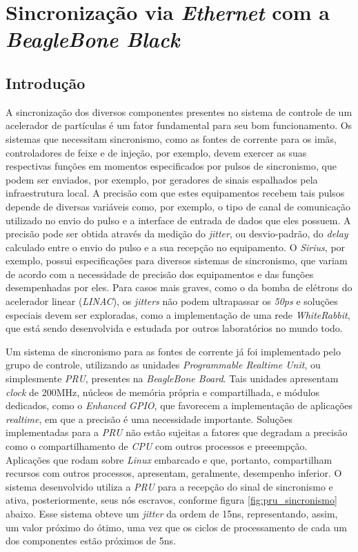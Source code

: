 \section {Sincronização via \textit{Ethernet} com a \textit{BeagleBone Black}}

\subsection {Introdução}

A sincronização dos diversos componentes presentes no sistema de controle de um
acelerador de partículas é um fator fundamental para seu bom funcionamento. Os
sistemas que necessitam sincronismo, como as fontes de corrente para os imãs,
controladores de feixe e de injeção, por exemplo, devem exercer as suas
respectivas funções em momentos especificados por pulsos de sincronismo, que
podem ser enviados, por exemplo, por geradores de sinais espalhados pela
infraestrutura local. A precisão com que estes equipamentos recebem tais pulsos
depende de diversas variáveis como, por exemplo, o tipo de canal de comunicação
utilizado no envio do pulso e a interface de entrada de dados que eles possuem.
A precisão pode ser obtida através da medição do \textit{jitter}, ou
desvio-padrão, do \textit{delay} calculado entre o envio do pulso e a sua
recepção no equipamento.
O \textit{Sirius}, por exemplo, possui especificações para diversos sistemas de
sincronismo, que variam de acordo com a necessidade de precisão dos equipamentos
e das funções desempenhadas por eles. Para casos mais graves, como o da bomba de
elétrons do acelerador linear (\textit{LINAC}), os \textit{jitters} não podem
ultrapassar os \textit{50ps} e soluções especiais devem ser exploradas, como a
implementação de uma rede \textit{WhiteRabbit}, que está sendo
desenvolvida e estudada por outros laboratórios no mundo todo.

\vspace{12pt}

Um sistema de sincronismo para as fontes de corrente já
foi implementado pelo grupo de controle, utilizando as unidades
\textit{Programmable Realtime Unit}, ou simplesmente \textit{PRU}, presentes na
\textit{BeagleBone Board}. Tais unidades apresentam \textit{clock} de 200MHz,
núcleos de memória própria e compartilhada, e módulos dedicados, como o
\textit{Enhanced GPIO}, que favorecem a implementação de aplicações
\textit{realtime}, em que a precisão é uma necessidade importante. Soluções
implementadas para a \textit{PRU} não estão sujeitas a fatores que degradam a
precisão como o compartilhamento de \textit{CPU} com outros
processos e preeempção. Aplicações que rodam sobre \textit{Linux} embarcado e
que, portanto, compartilham recursos com outros processos, apresentam,
geralmente, desempenho inferior. O sistema desenvolvido utiliza a \textit{PRU}
para a recepção do sinal de sincronismo e ativa, posteriormente, seus nós
escravos, conforme figura \ref{fig:pru_sincronismo} abaixo. Esse sistema obteve
um \textit{jitter} da ordem de 15ns, representando, assim, um valor próximo do
ótimo, uma vez que os ciclos de processamento de cada um dos componentes estão
próximos de 5ns.

